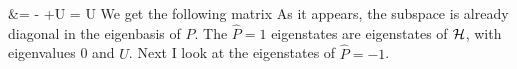 \documentclass[12pt]{article}
\begin{document}
\begin{itemize}
&= -\cc{\ket{\downarrow,\uparrow}-\ket{\uparrow,\downarrow}+\ket{\uparrow,\downarrow}-\ket{\downarrow,\uparrow}} +U = U
\eeq
We get the following matrix
\beq
{}
\eeq
As it appears, the subspace is already diagonal in the eigenbasis of \(\hat{P}\). The \(\hat{P} = 1\) eigenstates are eigenstates of \(\mathcal{H}\), with eigenvalues 0 and \(U\). Next I look at the eigenstates of \(\hat{P}=-1\).


\end{itemize}
\end{document}
